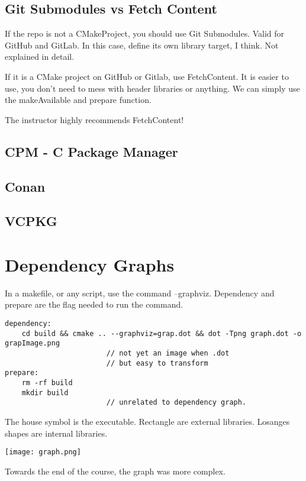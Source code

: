 \subsection{Git Submodules vs Fetch Content}

If the repo is not a CMakeProject, you should use Git Submodules. Valid for GitHub and GitLab. In this case, 
define its own library target, I think. Not explained in detail.

If it is a CMake project on GitHub or Gitlab, use FetchContent. It is easier to use, you don't need to mess with header
libraries or anything. We can simply use the makeAvailable and prepare function.

The instructor highly recommends FetchContent!

\subsection{CPM - C Package Manager}
\subsection{Conan}
\subsection{VCPKG}


\section{Dependency Graphs}

In a makefile, or any script, use the command --graphviz. Dependency and prepare are the flag needed to run the command.

\begin{verbatim}
dependency:
    cd build && cmake .. --graphviz=grap.dot && dot -Tpng graph.dot -o grapImage.png
                        // not yet an image when .dot
                        // but easy to transform
prepare:
    rm -rf build
    mkdir build
                        // unrelated to dependency graph.
\end{verbatim}

The house symbol is the executable. Rectangle are external libraries. Losanges shapes are internal libraries.

\begin{center}
    \texttt{[image: graph.png]}
\end{center}

Towards the end of the course, the graph was more complex.

